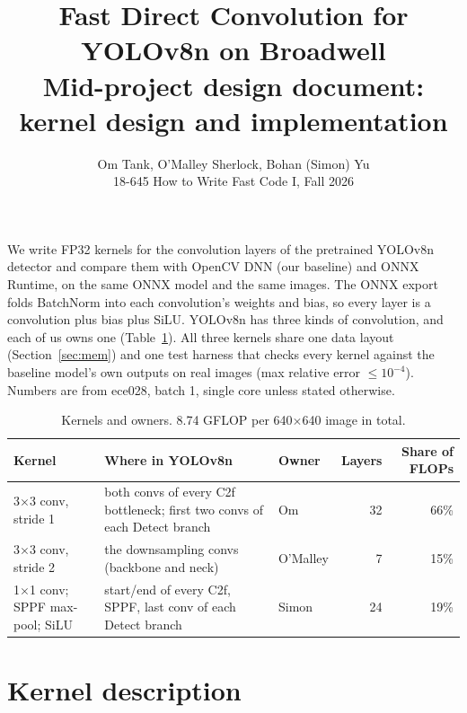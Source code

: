 \documentclass[10pt]{article}
\title{\vspace{-1.6em}\textbf{Fast Direct Convolution for YOLOv8n on Broadwell}\\[2pt]
\large Mid-project design document: kernel design and implementation}
\author{Om Tank, O'Malley Sherlock, Bohan (Simon) Yu\\
18-645 How to Write Fast Code I, Fall 2026}
\date{\vspace{-1.2em}}
\begin{document}
\maketitle

\noindent We write FP32 kernels for the convolution layers of the pretrained YOLOv8n detector and compare them with OpenCV DNN (our baseline) and ONNX Runtime, on the same ONNX model and the same images. The ONNX export folds BatchNorm into each convolution's weights and bias, so every layer is a convolution plus bias plus SiLU. YOLOv8n has three kinds of convolution, and each of us owns one (Table~\ref{tab:split}). All three kernels share one data layout (Section~\ref{sec:mem}) and one test harness that checks every kernel against the baseline model's own outputs on real images (max relative error $\le 10^{-4}$). Numbers are from ece028, batch 1, single core unless stated otherwise.

\begin{table}[H]\centering\small
\begin{tabular}{p{4.1cm}p{7.2cm}lrr}
\toprule
Kernel & Where in YOLOv8n & Owner & Layers & Share of FLOPs\\
\midrule
3$\times$3 conv, stride 1 & both convs of every C2f bottleneck; first two convs of each Detect branch & Om & 32 & 66\%\\
3$\times$3 conv, stride 2 & the downsampling convs (backbone and neck) & O'Malley & 7 & 15\%\\
1$\times$1 conv; SPPF max-pool; SiLU & start/end of every C2f, SPPF, last conv of each Detect branch & Simon & 24 & 19\%\\
\bottomrule
\end{tabular}
\caption{Kernels and owners. 8.74 GFLOP per 640$\times$640 image in total.}\label{tab:split}
\end{table}

\section{Kernel description}
\end{document}
